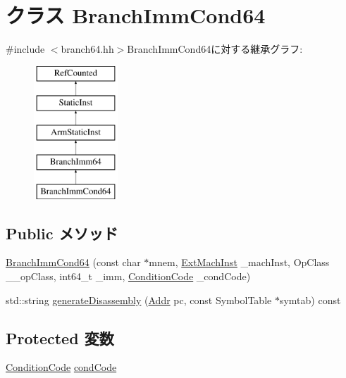 \hypertarget{classArmISA_1_1BranchImmCond64}{
\section{クラス BranchImmCond64}
\label{classArmISA_1_1BranchImmCond64}
}


{\ttfamily \#include $<$branch64.hh$>$}BranchImmCond64に対する継承グラフ:\begin{figure}[H]
\begin{center}
\leavevmode
\includegraphics[height=5cm]{classArmISA_1_1BranchImmCond64}
\end{center}
\end{figure}
\subsection*{Public メソッド}
\begin{DoxyCompactItemize}
\item 
\hyperlink{classArmISA_1_1BranchImmCond64_a536716b0bdc08118996466975aadb573}{BranchImmCond64} (const char $\ast$mnem, \hyperlink{classStaticInst_a5605d4fc727eae9e595325c90c0ec108}{ExtMachInst} \_\-machInst, OpClass \_\-\_\-opClass, int64\_\-t \_\-imm, \hyperlink{namespaceArmISA_ab8f08e777c4753720cff841f81da8e06}{ConditionCode} \_\-condCode)
\item 
std::string \hyperlink{classArmISA_1_1BranchImmCond64_a95d323a22a5f07e14d6b4c9385a91896}{generateDisassembly} (\hyperlink{classm5_1_1params_1_1Addr}{Addr} pc, const SymbolTable $\ast$symtab) const 
\end{DoxyCompactItemize}
\subsection*{Protected 変数}
\begin{DoxyCompactItemize}
\item 
\hyperlink{namespaceArmISA_ab8f08e777c4753720cff841f81da8e06}{ConditionCode} \hyperlink{classArmISA_1_1BranchImmCond64_a273dc0fe84de8f4a9cf52aaf8dc27885}{condCode}
\end{DoxyCompactItemize}


